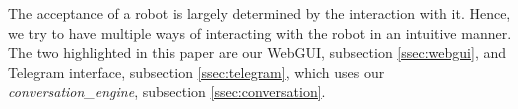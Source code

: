 The acceptance of a robot is largely determined by the interaction with it. Hence, we try to have multiple ways of interacting with the robot in an intuitive manner. The two highlighted in this paper are our WebGUI, subsection \ref{ssec:webgui}, and Telegram\texttrademark\hspace{0em} interface, subsection \ref{ssec:telegram}, which uses our \emph{conversation\_engine}, subsection \ref{ssec:conversation}.
